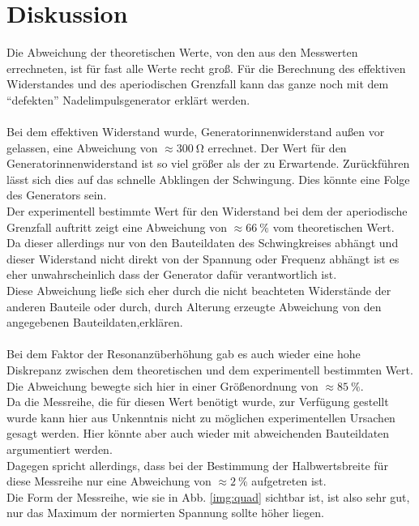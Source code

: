 \section{Diskussion}
Die Abweichung der theoretischen Werte, von den aus den Messwerten errechneten, ist für fast alle Werte recht groß.
Für die Berechnung des effektiven Widerstandes und des aperiodischen Grenzfall kann
das ganze noch mit dem \enquote{defekten} Nadelimpulsgenerator erklärt werden.\\\\
\noindent
Bei dem effektiven Widerstand wurde, Generatorinnenwiderstand außen vor gelassen, eine Abweichung von $\approx \SI{300}{\ohm}$ errechnet.
Der Wert für den Generatorinnenwiderstand ist so viel größer als der zu Erwartende. Zurückführen lässt sich dies auf das schnelle Abklingen der Schwingung.
Dies könnte eine Folge des Generators sein.\\
Der experimentell bestimmte Wert für den Widerstand bei dem der aperiodische Grenzfall auftritt
zeigt eine Abweichung von $\approx \SI{66}{\percent}$ vom theoretischen Wert.\\
Da dieser allerdings nur von den Bauteildaten des Schwingkreises abhängt und 
dieser Widerstand nicht direkt von der Spannung oder Frequenz abhängt ist es eher unwahrscheinlich
dass der Generator dafür verantwortlich ist.\\
Diese Abweichung ließe sich eher durch die nicht beachteten Widerstände der anderen Bauteile oder durch, durch Alterung erzeugte Abweichung von den angegebenen Bauteildaten,erklären.\\\\
\noindent
Bei dem Faktor der Resonanzüberhöhung gab es auch wieder eine hohe Diskrepanz zwischen dem theoretischen und dem experimentell bestimmten Wert.
Die Abweichung bewegte sich hier in einer Größenordnung von  $\approx \SI{85}{\percent}$.\\
Da die Messreihe, die für diesen Wert benötigt wurde, zur Verfügung gestellt wurde kann hier aus Unkenntnis nicht zu möglichen experimentellen Ursachen gesagt werden.
Hier könnte aber auch wieder mit abweichenden Bauteildaten argumentiert werden.\\
Dagegen spricht allerdings, dass bei der Bestimmung der Halbwertsbreite für diese Messreihe nur eine Abweichung von $\approx \SI{2}{\percent}$ aufgetreten ist.\\
Die Form der Messreihe, wie sie in Abb. \ref{img:quad} sichtbar ist, ist also sehr gut, nur das Maximum der normierten Spannung sollte höher liegen.\\\\
